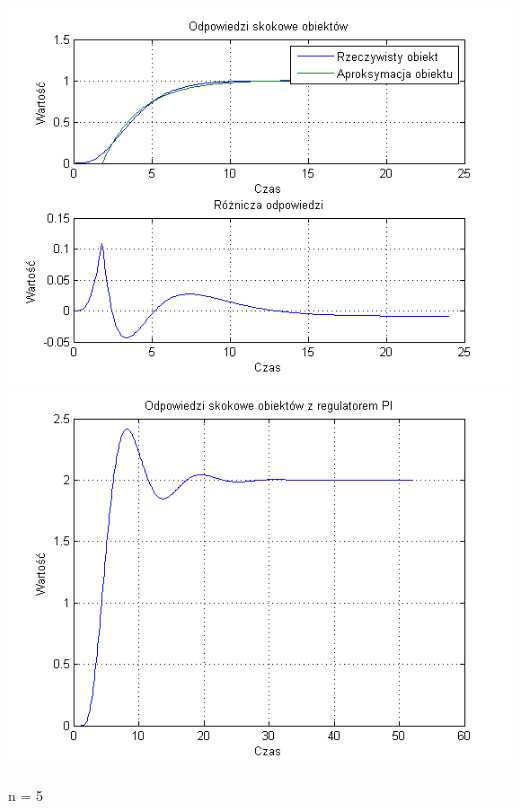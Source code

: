 \documentclass[10pt,a4paper]{article}
\begin{document}
\begin{center}
\includegraphics[scale=1]{images/jeden/skrypt_107.png}\\
\includegraphics[scale=1]{images/jeden/skrypt_108.png}\\
\end{center}
\newpage
n = 5
\end{document}
